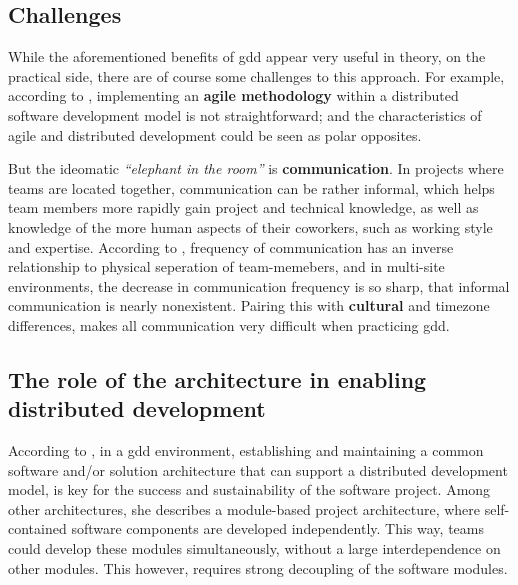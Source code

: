 \subsection{Challenges}

While the aforementioned benefits of \gls{gdd} appear very useful in theory, on
the practical side, there are of course some challenges to this approach. For
example, according to \textcite{Smite_etal_2010}, implementing an \textbf{agile
methodology} within a distributed software development model is not
straightforward; and the characteristics of agile and distributed development
could be seen as polar opposites. 


But the ideomatic \textit{``elephant in the room''} is \textbf{communication}.
In projects where teams are located together, communication can be rather
informal, which helps team members more rapidly gain project and technical
knowledge, as well as knowledge of the more human aspects of their coworkers,
such as working style and expertise. According to \textcite{Sengupta_2006},
frequency of communication has an inverse relationship to physical seperation of
team-memebers, and in multi-site environments, the decrease in communication
frequency is so sharp, that informal communication is nearly nonexistent.
Pairing this with \textbf{cultural} and timezone differences, makes all
communication very difficult when practicing \gls{gdd}.


\subsection{The role of the architecture in enabling distributed development}

According to \textcite{Yuhong_2008}, in a \gls{gdd} environment, establishing
and maintaining a common software and/or solution architecture that can support
a distributed development model, is key for the success and sustainability of
the software project. Among other architectures, she describes a module-based
project architecture, where self-contained software components are developed
independently. This way, teams could develop these modules simultaneously,
without a large interdependence on other modules. This however, requires strong
decoupling of the software modules.

